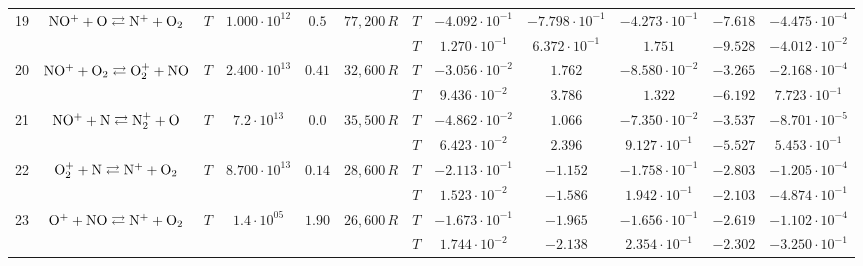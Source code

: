 \documentclass{warpdoc}
\begin{document}
\begin{table}[!ht]
\begin{center}
\begin{threeparttable}
\begin{tabular}{cccccccccccc}
                                          
19 & $\rm NO^+ + O \rightleftarrows N^+ + O_2 $ &$T$ & $1.000 \cdot 10^{12}$ & $0.5$ & $77,200\, R$ 
                                          &$T$  & $-4.092 \cdot 10^{-1}$  & $-7.798 \cdot 10^{-1}$  & $-4.273 \cdot 10^{-1}$ & $-7.618$ & $-4.475 \cdot 10^{-4}$\\
 & & & & &                                &$T$  & $1.270 \cdot 10^{-1}$  & $6.372 \cdot 10^{-1}$  & $1.751$ & $-9.528$ & $-4.012 \cdot 10^{-2}$\\
 
                                          
20 & $\rm NO^{+} + O_2 \rightleftarrows O_2^{+} + NO $ &$T$ & $2.400 \cdot 10^{13}$ & $0.41$ & $32,600\, R$ 
                                          &$T$  & $-3.056 \cdot 10^{-2}$  & $1.762$  & $-8.580 \cdot 10^{-2}$ & $-3.265$ & $-2.168 \cdot 10^{-4}$\\
 & & & & &                                &$T$  & $9.436 \cdot 10^{-2}$  & $3.786$  & $1.322$ & $-6.192$ & $7.723 \cdot 10^{-1}$\\
 
                                          
21 & $\rm NO^+ + N \rightleftarrows N_2^+ + O $ &$T$ & $7.2 \cdot 10^{13}$ & $0.0$ & $35,500\, R$ 
                                          &$T$  & $-4.862 \cdot 10^{-2}$  & $1.066$  & $-7.350 \cdot 10^{-2}$ & $-3.537$ & $-8.701 \cdot 10^{-5}$\\
 & & & & &                                &$T$  & $6.423 \cdot 10^{-2}$  & $2.396$  & $9.127 \cdot 10^{-1}$ & $-5.527$ & $5.453 \cdot 10^{-1}$\\
 
                                          
22 & $\rm O_2^+ + N \rightleftarrows N^+ + O_2$ &$T$ & $8.700 \cdot 10^{13}$ & $0.14$ & $28,600\, R$ 
                                          &$T$  & $-2.113 \cdot 10^{-1}$  & $-1.152$  & $-1.758 \cdot 10^{-1}$ & $-2.803$ & $-1.205 \cdot 10^{-4}$\\
 & & & & &                                &$T$  & $1.523 \cdot 10^{-2}$  & $-1.586$  & $1.942 \cdot 10^{-1}$ & $-2.103$ & $-4.874 \cdot 10^{-1}$\\
 
                                          
23 & $\rm O^+ + NO \rightleftarrows N^+ + O_2$ &$T$ & $1.4 \cdot 10^{05}$ & $1.90$ & $26,600\, R$ 
                                          &$T$  & $-1.673 \cdot 10^{-1}$  & $-1.965$  & $-1.656 \cdot 10^{-1}$ & $-2.619$ & $-1.102 \cdot 10^{-4}$\\
 & & & & &                                &$T$  & $1.744 \cdot 10^{-2}$  & $-2.138$  & $2.354 \cdot 10^{-1}$ & $-2.302$ & $-3.250 \cdot 10^{-1}$\\
 

\end{tabular}
\end{threeparttable}
\end{center}
\end{table}
\end{document}
